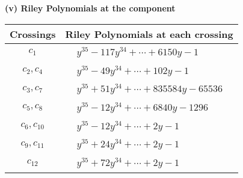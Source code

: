 \documentclass[1p]{elsarticle_modified}
\theoremstyle{definition}
\begin{document}
\newpage\renewcommand{\arraystretch}{1}
\flushleft \textbf{(v) Riley Polynomials at the component}\newline \\
\begin{tabular}{m{50pt}|m{274pt}}
Crossings & \hspace{64pt}Riley Polynomials at each crossing \\
\hline $$\begin{aligned}c_{1}\end{aligned}$$&$\begin{aligned}
&y^{35}-117 y^{34}+\cdots+6150 y-1
\end{aligned}$\\
\hline $$\begin{aligned}c_{2},c_{4}\end{aligned}$$&$\begin{aligned}
&y^{35}-49 y^{34}+\cdots+102 y-1
\end{aligned}$\\
\hline $$\begin{aligned}c_{3},c_{7}\end{aligned}$$&$\begin{aligned}
&y^{35}+51 y^{34}+\cdots+835584 y-65536
\end{aligned}$\\
\hline $$\begin{aligned}c_{5},c_{8}\end{aligned}$$&$\begin{aligned}
&y^{35}-12 y^{34}+\cdots+6840 y-1296
\end{aligned}$\\
\hline $$\begin{aligned}c_{6},c_{10}\end{aligned}$$&$\begin{aligned}
&y^{35}-12 y^{34}+\cdots+2 y-1
\end{aligned}$\\
\hline $$\begin{aligned}c_{9},c_{11}\end{aligned}$$&$\begin{aligned}
&y^{35}+24 y^{34}+\cdots+2 y-1
\end{aligned}$\\
\hline $$\begin{aligned}c_{12}\end{aligned}$$&$\begin{aligned}
&y^{35}+72 y^{34}+\cdots+2 y-1
\end{aligned}$\\
\hline
\end{tabular}\\~\\
\end{document}
